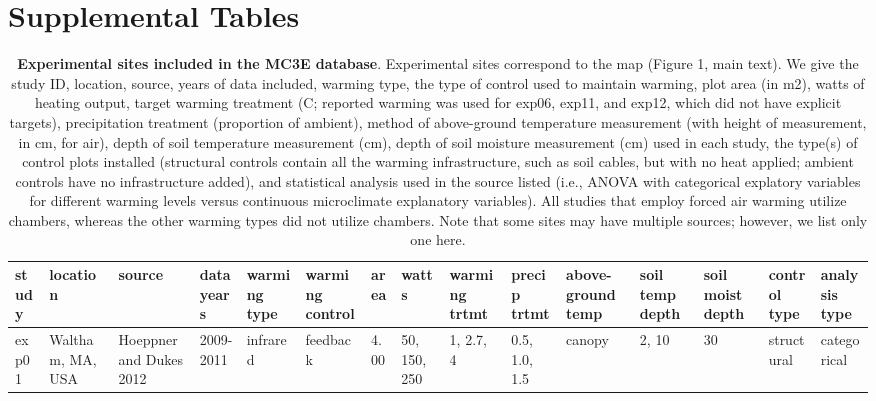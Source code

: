 \documentclass{article}
\begin{document}
\section* {Supplemental Tables} 
\begin{landscape}
\begin{footnotesize} 
\begin{table}[ht]
\centering
\caption{\textbf{Experimental sites included in the MC3E database}. Experimental sites correspond to the map (Figure 1, main text). We give the study ID, location, source, years of data included, warming type, the type of control used to maintain warming, plot area (in m2), watts of heating output, target warming treatment (\degree C; reported warming was used for exp06, exp11, and exp12, which did not have explicit targets), precipitation treatment (proportion of ambient), method of above-ground temperature measurement (with height of measurement, in cm, for air), depth of soil temperature measurement (cm), depth of soil moisture measurement (cm) used in each study, the type(s) of control plots installed (structural controls contain all the warming infrastructure, such as soil cables, but with no heat applied; ambient controls have no infrastructure added), and statistical analysis used in the source listed (i.e., ANOVA with categorical explatory variables for different warming levels versus continuous microclimate explanatory variables). All studies that employ forced air warming utilize chambers, whereas the other warming types did not utilize chambers. Note that some sites may have multiple sources; however, we list only one here.} 
\label{tab:methods}
\begingroup\footnotesize
\begin{tabular}{|p{}|p{}|p{}|p{}|p{}|p{}|p{}|p{}|p{}|p{}|p{}|p{}|p{}|p{}|p{}|}
  \hline
study & location & source & data years & warming type & warming control & area & watts & warming trtmt & precip trtmt & above-ground temp & soil temp depth & soil moist depth & control type & analysis type \\ 
  \hline
exp01 & Waltham, MA, USA & Hoeppner and Dukes 2012 & 2009-2011 & infrared & feedback & 4.00 & 50, 150, 250 & 1, 2.7, 4 & 0.5, 1.0, 1.5 & canopy & 2, 10 & 30 & structural & categorical \\ 
   \hline

\end{tabular}
\end{table}
\end{footnotesize}
\end{landscape}
\end{document}
